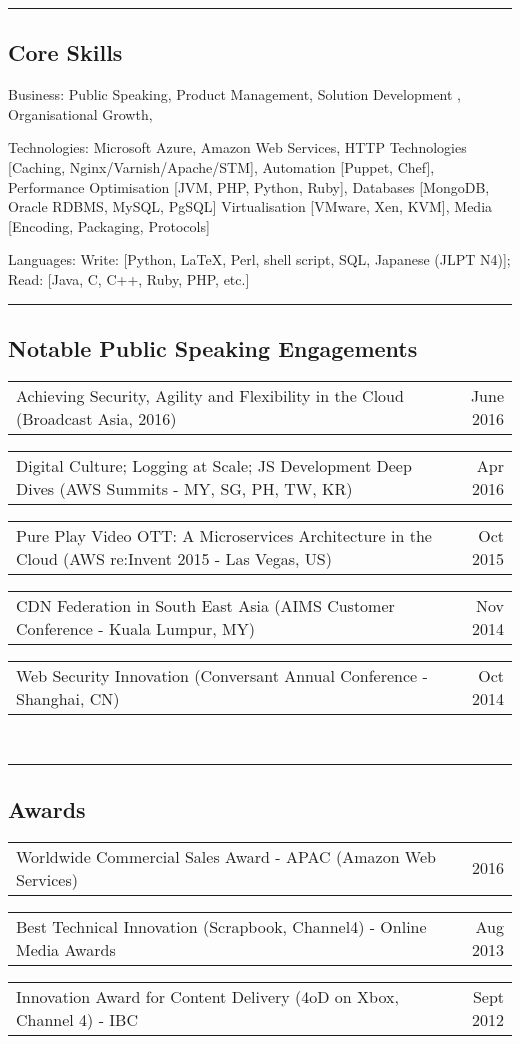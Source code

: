 \documentclass[10pt,a4paper]{article}
\makeatletter
\newenvironment{indentsection}[1]%
{\begin{list}{}%
    {\setlength{\leftmargin}{#1}}%
    \item[]%
}
{\end{list}}
\newcommand{\headerrow}[2]
{\begin{tabular*}{\linewidth}{l@{\extracolsep{\fill}}r}
    #1 &
    #2 \\
\end{tabular*}}
\makeatother
\begin{document}
\hrule
\vspace{-0.4em}
\subsection*{Core Skills}

\begin{indentsection}{\parindent}
\begin{description*}
    \item[Business:]
    Public Speaking, Product Management, Solution Development , Organisational Growth, 
    \item[Technologies:]
    Microsoft Azure, Amazon Web Services, HTTP Technologies [Caching, Nginx/Varnish/Apache/STM], Automation [Puppet, Chef], Performance Optimisation [JVM, PHP, Python, Ruby], Databases [MongoDB, Oracle RDBMS, MySQL, PgSQL] Virtualisation [VMware, Xen, KVM], Media [Encoding, Packaging, Protocols]
    \item[Languages:]
    Write: [Python, \LaTeX, Perl, shell script, SQL, Japanese (JLPT N4)]; Read: [Java, C, C++, Ruby, PHP, etc.]
\end{description*}
\end{indentsection}

\hrule
\vspace{-0.4em}
\subsection*{Notable Public Speaking Engagements}
    \headerrow
        {Achieving Security, Agility and Flexibility in the Cloud (Broadcast Asia, 2016)}
        {June 2016}
    \headerrow
        {Digital Culture; Logging at Scale; JS Development Deep Dives (AWS Summits - MY, SG, PH, TW, KR)}
        {Apr 2016}
    \headerrow
        {Pure Play Video OTT: A Microservices Architecture in the Cloud (AWS re:Invent 2015 - Las Vegas, US)}
        {Oct 2015}
    \headerrow
        {CDN Federation in South East Asia (AIMS Customer Conference - Kuala Lumpur, MY)}
        {Nov 2014}
    \headerrow
        {Web Security Innovation (Conversant Annual Conference - Shanghai, CN)}
        {Oct 2014}
\\
\hrule
\vspace{-0.4em}
\subsection*{Awards}
    \headerrow
        {Worldwide Commercial Sales Award - APAC (Amazon Web Services)}
        {2016}
    \headerrow
        {Best Technical Innovation (Scrapbook, Channel4) - Online Media Awards}
        {Aug 2013}
    \headerrow
        {Innovation Award for Content Delivery (4oD on Xbox, Channel 4) - IBC}
        {Sept 2012}
\end{document}
